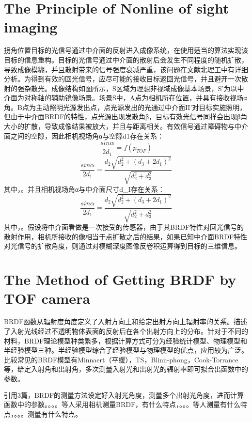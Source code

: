 \documentclass[sensors,article,accept,moreauthors,pdftex,10pt,a4paper]{mdpi}
\begin{document}
\section{The Principle of Nonline of sight imaging}%
\label{sect:PrincipleNOLS}
拐角位置目标的光信号通过中介面的反射进入成像系统，在使用适当的算法实现该目标的信息重构。目标的光信号通过中介面的散射后会发生不同程度的随机扩散，导致成像模糊，并且散射带来的信号强度衰减严重，该问题在文献北理工中有详细分析。为得到有效的回光信号，应尽可能的接收目标返回光信号，并且避开一次散射的强杂散光。成像结构如图所示，S区域为理想非视域成像基本场景，S'为以中介面为对称轴的辅助镜像场景。场景S中，A点为相机所在位置，并具有接收视场α角。B点为主动照明光源发出点，点光源发出的光通过中介面II'对目标实施照明，但由于中介面BRDF的特性，点光源出现发散角β，目标有效光信号同样会出现β角大小的扩散，导致成像结果被放大，并且与距离相关。有效信号通过障碍物与中介面之间的空隙，因此相机视场角α与空隙d1存在关系：
\begin{equation}
  \frac{sin\alpha }{2d_1}=f\left (p_{TOF}\right )
\end{equation}
\begin{equation}
  \frac{sin\alpha }{2d_1}=\frac{d_2\sqrt{d_2^2+\left (d_3+ 2d_1\right )^2}}{\sqrt{d_2^2+d_3^2}}
\end{equation}
其中，。并且相机视场角α与中介面尺寸d_I存在关系：
\begin{equation}
\frac{sin\alpha }{2d_1}=\frac{d_2\sqrt{d_2^2+\left (d_3+ 2d_1\right )^2}}{\sqrt{d_2^2+d_3^2}}
\end{equation}
其中，。假设将中介面看做是一次接受的传感器，由于其BRDF特性对回光信号的散射作用，相机所接收的像相当于点扩散之后的结果，如果已知中介面BRDF特性对光信号的扩散角度，则通过对模糊深度图像反卷积运算得到目标的三维信息。
\section{The Method of Getting BRDF by TOF camera}%
\label{sect:BRDFTOF}
BRDF函数从辐射度角度定义了入射方向上和给定出射方向上辐射率的关系。描述了入射光线经过不透明物体表面的反射后在各个出射方向上的分布。针对于不同的材料，BRDF理论模型种类繁多，根据计算方式可分为经验统计模型、物理模型和半经验模型三种。半经验模型综合了经验模型与物理模型的优点，应用较为广泛。比较常见的BRDF模型有Minnaert（平缓），TS，Blinn-phong，Cook-Torrance等，给定入射角和出射角，多次测量入射光和出射光的辐射率即可拟合出函数中的参数。

引用3篇，BRDF的测量方法设定好入射光角度，测量多个出射光角度，进而计算函数中的参数。。。。等人采用相机测量BRDF，有什么特点，。。。等人测量有什么特点，。。。测量有什么特点。
\end{document}
